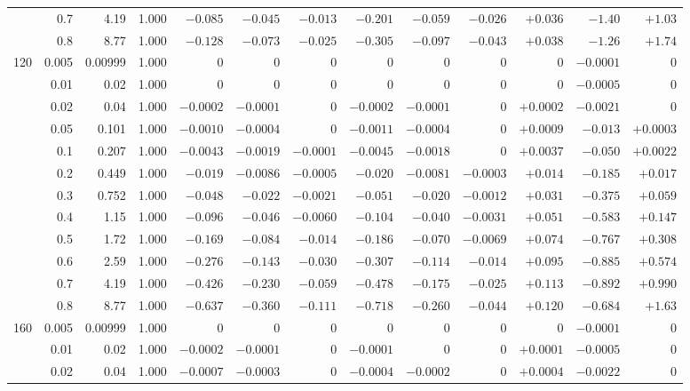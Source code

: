 \documentclass[11pt,a4paper]{article}
\begin{document}
\begin{table}[htbp]
\begin{tabular}{rrrrrrrrrrrrr}
 & 0.7 & 4.19 & 1.000 & $-0.085$ & $-0.045$ & $-0.013$ & $-0.201$ & $-0.059$ & $-0.026$ & $+0.036$ & $-1.40$ & $+1.03$ \\
 & 0.8 & 8.77 & 1.000 & $-0.128$ & $-0.073$ & $-0.025$ & $-0.305$ & $-0.097$ & $-0.043$ & $+0.038$ & $-1.26$ & $+1.74$ \\
\midrule
120 & 0.005 & 0.00999 & 1.000 & $0$ & $0$ & $0$ & $0$ & $0$ & $0$ & $0$ & $-0.0001$ & $0$ \\
 & 0.01 & 0.02 & 1.000 & $0$ & $0$ & $0$ & $0$ & $0$ & $0$ & $0$ & $-0.0005$ & $0$ \\
 & 0.02 & 0.04 & 1.000 & $-0.0002$ & $-0.0001$ & $0$ & $-0.0002$ & $-0.0001$ & $0$ & $+0.0002$ & $-0.0021$ & $0$ \\
 & 0.05 & 0.101 & 1.000 & $-0.0010$ & $-0.0004$ & $0$ & $-0.0011$ & $-0.0004$ & $0$ & $+0.0009$ & $-0.013$ & $+0.0003$ \\
 & 0.1 & 0.207 & 1.000 & $-0.0043$ & $-0.0019$ & $-0.0001$ & $-0.0045$ & $-0.0018$ & $0$ & $+0.0037$ & $-0.050$ & $+0.0022$ \\
 & 0.2 & 0.449 & 1.000 & $-0.019$ & $-0.0086$ & $-0.0005$ & $-0.020$ & $-0.0081$ & $-0.0003$ & $+0.014$ & $-0.185$ & $+0.017$ \\
 & 0.3 & 0.752 & 1.000 & $-0.048$ & $-0.022$ & $-0.0021$ & $-0.051$ & $-0.020$ & $-0.0012$ & $+0.031$ & $-0.375$ & $+0.059$ \\
 & 0.4 & 1.15 & 1.000 & $-0.096$ & $-0.046$ & $-0.0060$ & $-0.104$ & $-0.040$ & $-0.0031$ & $+0.051$ & $-0.583$ & $+0.147$ \\
 & 0.5 & 1.72 & 1.000 & $-0.169$ & $-0.084$ & $-0.014$ & $-0.186$ & $-0.070$ & $-0.0069$ & $+0.074$ & $-0.767$ & $+0.308$ \\
 & 0.6 & 2.59 & 1.000 & $-0.276$ & $-0.143$ & $-0.030$ & $-0.307$ & $-0.114$ & $-0.014$ & $+0.095$ & $-0.885$ & $+0.574$ \\
 & 0.7 & 4.19 & 1.000 & $-0.426$ & $-0.230$ & $-0.059$ & $-0.478$ & $-0.175$ & $-0.025$ & $+0.113$ & $-0.892$ & $+0.990$ \\
 & 0.8 & 8.77 & 1.000 & $-0.637$ & $-0.360$ & $-0.111$ & $-0.718$ & $-0.260$ & $-0.044$ & $+0.120$ & $-0.684$ & $+1.63$ \\
\midrule
160 & 0.005 & 0.00999 & 1.000 & $0$ & $0$ & $0$ & $0$ & $0$ & $0$ & $0$ & $-0.0001$ & $0$ \\
 & 0.01 & 0.02 & 1.000 & $-0.0002$ & $-0.0001$ & $0$ & $-0.0001$ & $0$ & $0$ & $+0.0001$ & $-0.0005$ & $0$ \\
 & 0.02 & 0.04 & 1.000 & $-0.0007$ & $-0.0003$ & $0$ & $-0.0004$ & $-0.0002$ & $0$ & $+0.0004$ & $-0.0022$ & $0$ \\

\end{tabular}
\end{table}
\end{document}
